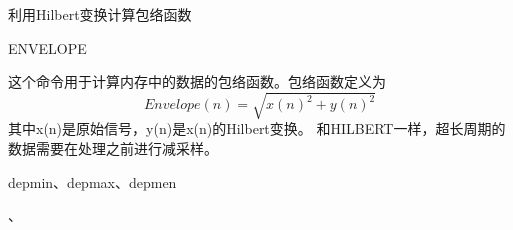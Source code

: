 \label{cmd:envelope}

利用Hilbert变换计算包络函数

\begin{SACSTX}
ENVELOPE
\end{SACSTX}

这个命令用于计算内存中的数据的包络函数。包络函数定义为
	\[ Envelope(n)= \sqrt{x(n)^2+y(n)^2} \]
其中x(n)是原始信号，y(n)是x(n)的Hilbert变换。
和HILBERT一样，超长周期的数据需要在处理之前进行减采样。

depmin、depmax、depmen

、
